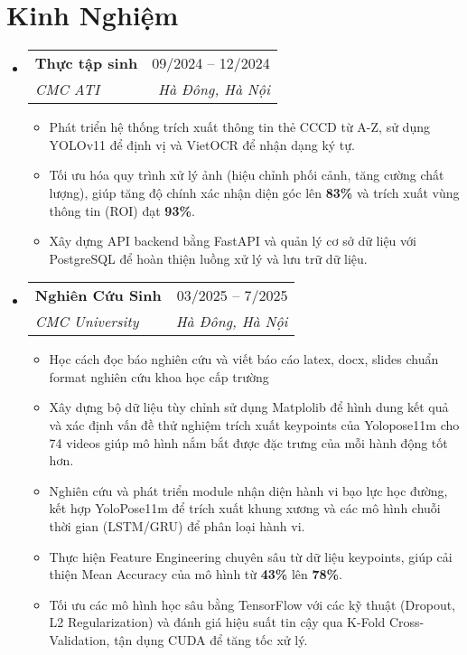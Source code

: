 \documentclass[letterpaper,11pt]{article}
\makeatletter
\newcommand{\resumeItem}[1]{
	\item\small{
	{#1 \vspace{-2pt}}
	}
}
\newcommand{\resumeSubheading}[4]{
	\vspace{-2pt}\item
	\begin{tabular*}{0.97\textwidth}[t]{l@{\extracolsep{\fill}}r}
		\textbf{#1} & #2 \\
		\textit{\small#3} & \textit{\small #4} \\
	\end{tabular*}\vspace{-7pt}
}
\newcommand{\resumeSubHeadingListStart}{\begin{itemize}[leftmargin=0.15in, label={}]}
\newcommand{\resumeSubHeadingListEnd}{\end{itemize}}
\newcommand{\resumeItemListStart}{\begin{itemize}}
\newcommand{\resumeItemListEnd}{\end{itemize}\vspace{-5pt}}
\makeatother
\begin{document}
\section{Kinh Nghiệm}
	\resumeSubHeadingListStart
		\resumeSubheading
			{Thực tập sinh} {09/2024 -- 12/2024 }
			{CMC ATI} {Hà Đông, Hà Nội}
		        \resumeItemListStart
		            \resumeItem{Phát triển hệ thống trích xuất thông tin thẻ CCCD từ A-Z, sử dụng YOLOv11 để định vị và VietOCR để nhận dạng ký tự.}
		            \resumeItem{Tối ưu hóa quy trình xử lý ảnh (hiệu chỉnh phối cảnh, tăng cường chất lượng), giúp tăng độ chính xác nhận diện góc lên \textbf{83\%} và trích xuất vùng thông tin (ROI) đạt \textbf{93\%}.}
		            \resumeItem{Xây dựng API backend bằng FastAPI và quản lý cơ sở dữ liệu với PostgreSQL để hoàn thiện luồng xử lý và lưu trữ dữ liệu.}
		        \resumeItemListEnd

		\resumeSubheading
			{Nghiên Cứu Sinh} {03/2025 -- 7/2025} %
			{CMC University} {Hà Đông, Hà Nội}
			\resumeItemListStart
			\resumeItem{Học cách đọc báo nghiên cứu và viết báo cáo latex, docx, slides chuẩn format nghiên cứu khoa học cấp trường}
			\resumeItem{Xây dựng bộ dữ liệu tùy chỉnh sử dụng Matplolib để hình dung kết quả và xác định vấn đề  thử nghiệm trích xuất keypoints của Yolopose11m cho 74 videos giúp mô hình nắm bắt được đặc trưng của mỗi hành động tốt hơn.}
			\resumeItem{Nghiên cứu và phát triển module nhận diện hành vi bạo lực học đường, kết hợp YoloPose11m để trích xuất khung xương và các mô hình chuỗi thời gian (LSTM/GRU) để phân loại hành vi.}
		            \resumeItem{Thực hiện Feature Engineering chuyên sâu từ dữ liệu keypoints, giúp cải thiện Mean Accuracy của mô hình từ \textbf{43\%} lên \textbf{78\%}.}
		            \resumeItem{Tối ưu các mô hình học sâu bằng TensorFlow với các kỹ thuật (Dropout, L2 Regularization) và đánh giá hiệu suất tin cậy qua K-Fold Cross-Validation, tận dụng CUDA để tăng tốc xử lý.}
		        \resumeItemListEnd
		

	\resumeSubHeadingListEnd

\end{document}

